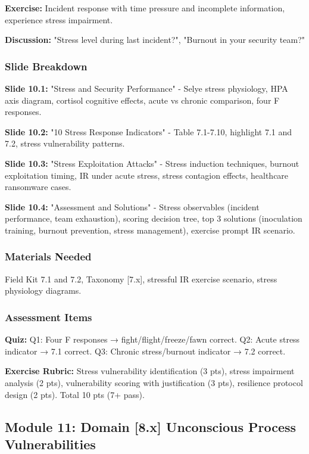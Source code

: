 \documentclass[11pt,a4paper]{article}
\begin{document}
\textbf{Exercise:} Incident response with time pressure and incomplete information, experience stress impairment.

\textbf{Discussion:} "Stress level during last incident?", "Burnout in your security team?"

\subsubsection{Slide Breakdown}
\textbf{Slide 10.1:} "Stress and Security Performance" - Selye stress physiology, HPA axis diagram, cortisol cognitive effects, acute vs chronic comparison, four F responses.

\textbf{Slide 10.2:} "10 Stress Response Indicators" - Table 7.1-7.10, highlight 7.1 and 7.2, stress vulnerability patterns.

\textbf{Slide 10.3:} "Stress Exploitation Attacks" - Stress induction techniques, burnout exploitation timing, IR under acute stress, stress contagion effects, healthcare ransomware cases.

\textbf{Slide 10.4:} "Assessment and Solutions" - Stress observables (incident performance, team exhaustion), scoring decision tree, top 3 solutions (inoculation training, burnout prevention, stress management), exercise prompt IR scenario.

\subsubsection{Materials Needed}
Field Kit 7.1 and 7.2, Taxonomy [7.x], stressful IR exercise scenario, stress physiology diagrams.

\subsubsection{Assessment Items}
\textbf{Quiz:} Q1: Four F responses → fight/flight/freeze/fawn correct. Q2: Acute stress indicator → 7.1 correct. Q3: Chronic stress/burnout indicator → 7.2 correct.

\textbf{Exercise Rubric:} Stress vulnerability identification (3 pts), stress impairment analysis (2 pts), vulnerability scoring with justification (3 pts), resilience protocol design (2 pts). Total 10 pts (7+ pass).

\subsection{Module 11: Domain [8.x] Unconscious Process Vulnerabilities}
\end{document}
